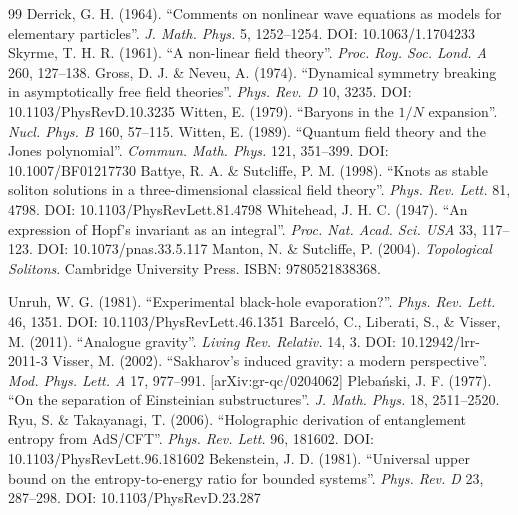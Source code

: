 \documentclass[a4paper,12pt]{article}
\begin{document}
\begin{thebibliography}{99}
 Derrick, G. H. (1964). ``Comments on nonlinear wave equations as models for elementary particles''. \textit{J. Math. Phys.} 5, 1252--1254. DOI: 10.1063/1.1704233
 Skyrme, T. H. R. (1961). ``A non-linear field theory''. \textit{Proc. Roy. Soc. Lond. A} 260, 127--138.
 Gross, D. J. \& Neveu, A. (1974). ``Dynamical symmetry breaking in asymptotically free field theories''. \textit{Phys. Rev. D} 10, 3235. DOI: 10.1103/PhysRevD.10.3235
 Witten, E. (1979). ``Baryons in the $1/N$ expansion''. \textit{Nucl. Phys. B} 160, 57--115.
 Witten, E. (1989). ``Quantum field theory and the Jones polynomial''. \textit{Commun. Math. Phys.} 121, 351--399. DOI: 10.1007/BF01217730
 Battye, R. A. \& Sutcliffe, P. M. (1998). ``Knots as stable soliton solutions in a three-dimensional classical field theory''. \textit{Phys. Rev. Lett.} 81, 4798. DOI: 10.1103/PhysRevLett.81.4798
 Whitehead, J. H. C. (1947). ``An expression of Hopf's invariant as an integral''. \textit{Proc. Nat. Acad. Sci. USA} 33, 117--123. DOI: 10.1073/pnas.33.5.117
 Manton, N. \& Sutcliffe, P. (2004). \textit{Topological Solitons}. Cambridge University Press. ISBN: 9780521838368.

 Unruh, W. G. (1981). ``Experimental black-hole evaporation?''. \textit{Phys. Rev. Lett.} 46, 1351. DOI: 10.1103/PhysRevLett.46.1351
 Barcel\'o, C., Liberati, S., \& Visser, M. (2011). ``Analogue gravity''. \textit{Living Rev. Relativ.} 14, 3. DOI: 10.12942/lrr-2011-3
 Visser, M. (2002). ``Sakharov's induced gravity: a modern perspective''. \textit{Mod. Phys. Lett. A} 17, 977--991. [arXiv:gr-qc/0204062]
 Pleba\'nski, J. F. (1977). ``On the separation of Einsteinian substructures''. \textit{J. Math. Phys.} 18, 2511--2520.
 Ryu, S. \& Takayanagi, T. (2006). ``Holographic derivation of entanglement entropy from AdS/CFT''. \textit{Phys. Rev. Lett.} 96, 181602. DOI: 10.1103/PhysRevLett.96.181602
 Bekenstein, J. D. (1981). ``Universal upper bound on the entropy-to-energy ratio for bounded systems''. \textit{Phys. Rev. D} 23, 287--298. DOI: 10.1103/PhysRevD.23.287


\end{thebibliography}
\end{document}
